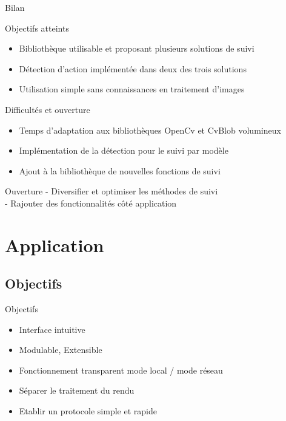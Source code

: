 \documentclass{beamer}
\begin{document}
            \begin{frame}{Bilan}
                  \begin{exampleblock}{Objectifs atteints}
                        \begin{itemize}
                        \item Bibliothèque utilisable et proposant plusieurs solutions de suivi
                        \item Détection d'action implémentée dans deux des trois solutions
                        \item Utilisation simple sans connaissances en traitement d'images
                        \end{itemize}
                  \end{exampleblock}
                  \pause
                  \begin{alertblock}{Difficultés et ouverture}
                        \begin{itemize}
                        \item Temps d'adaptation aux bibliothèques OpenCv et CvBlob volumineux
                        \item Implémentation de la détection pour le suivi par modèle
                        \item Ajout à la bibliothèque de nouvelles fonctions de suivi
                        \end{itemize}
                  \end{alertblock}
                  \pause		  
                  \begin{block}{Ouverture}
                        - Diversifier et optimiser les méthodes de suivi \\
                        - Rajouter des fonctionnalités côté application \\
                  \end{block}				  
            \end{frame}
      
	
	\section{Application}
	
		\subsection{Objectifs}
		\begin{frame}{Objectifs}
			\begin{itemize}
				\item Interface intuitive
				\item Modulable, Extensible
				\item Fonctionnement transparent mode local / mode réseau
				\item Séparer le traitement du rendu
				\item Etablir un protocole simple et rapide
			\end{itemize}
		\end{frame}
	
\end{document}

